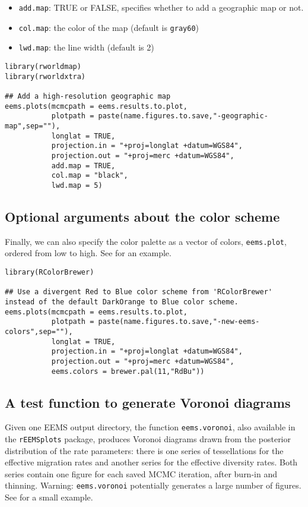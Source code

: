 \documentclass[a4paper,10pt,DIV=15,titlepage,mpinclude=true]{scrartcl}
\newcommand{\keystring}[1]{{\tt #1}}
\begin{document}
\begin{itemize}
  \item \keystring{add.map}: TRUE or FALSE, specifies whether to add a geographic map or not.
  \item \keystring{col.map}: the color of the map (default is \keystring{gray60})
  \item \keystring{lwd.map}: the line width (default is 2)
\end{itemize}

\begin{lstlisting}[style=Rcode]
library(rworldmap)
library(rworldxtra)

## Add a high-resolution geographic map
eems.plots(mcmcpath = eems.results.to.plot,
           plotpath = paste(name.figures.to.save,"-geographic-map",sep=""),
           longlat = TRUE,
           projection.in = "+proj=longlat +datum=WGS84",
           projection.out = "+proj=merc +datum=WGS84",
           add.map = TRUE,
           col.map = "black",
           lwd.map = 5)
\end{lstlisting}

\subsection{Optional arguments about the color scheme}

Finally, we can also specify the color palette as a vector of colors, \keystring{eems.plot}, ordered from low to high. See  for an example.

\begin{lstlisting}[style=Rcode]
library(RColorBrewer)

## Use a divergent Red to Blue color scheme from 'RColorBrewer' instead of the default DarkOrange to Blue color scheme.                                                     
eems.plots(mcmcpath = eems.results.to.plot,
           plotpath = paste(name.figures.to.save,"-new-eems-colors",sep=""),
           longlat = TRUE,
           projection.in = "+proj=longlat +datum=WGS84",
           projection.out = "+proj=merc +datum=WGS84",
           eems.colors = brewer.pal(11,"RdBu"))
\end{lstlisting}

\subsection{A test function to generate Voronoi diagrams}

Given one EEMS output directory, the function \keystring{eems.voronoi}, also available in the \keystring{rEEMSplots} package, produces Voronoi diagrams drawn from the posterior distribution of the rate parameters: there is one series of tessellations for the effective migration rates and another series for the effective diversity rates. Both series contain one figure for each saved MCMC iteration, after burn-in and thinning. Warning: \keystring{eems.voronoi} potentially generates a large number of figures. See  for a small example.
\end{document}
